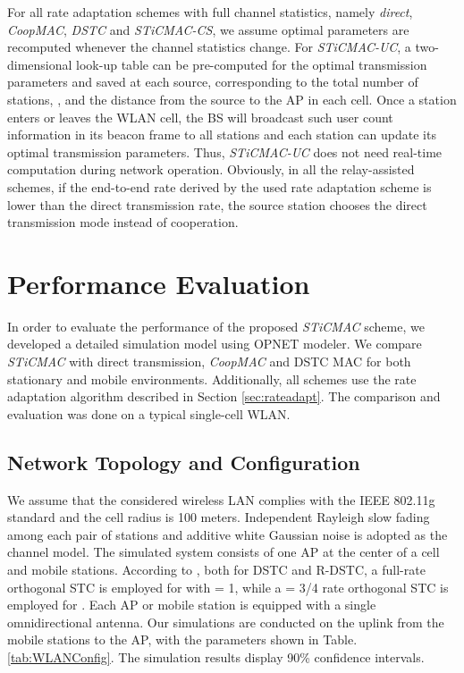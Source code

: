 \documentclass[peerreview,draftcls,onecolumn,12pt,a4paper]{IEEEtran}
\begin{document}
For all rate adaptation schemes with full channel statistics, namely \emph{direct}, \emph{CoopMAC}, \emph{DSTC} and \emph{STiCMAC-CS}, we assume optimal parameters are recomputed whenever the channel statistics change. For \emph{STiCMAC-UC}, a two-dimensional look-up table can be
pre-computed for the optimal transmission parameters and saved at
each source, corresponding to the total number of stations, ,
and the distance from the source to the AP in each cell. Once a
station enters or leaves the WLAN cell, the BS will broadcast such
user count information in its beacon frame to all stations and
each station can update its optimal transmission parameters. Thus,
\emph{STiCMAC-UC} does not need real-time computation during
network operation. Obviously, in all the relay-assisted schemes,
if the end-to-end rate derived by the used rate adaptation scheme
is lower than the direct transmission rate, the source station
chooses the direct transmission mode instead of cooperation.





\vspace{-0.2in}
\section{Performance Evaluation}
\label{PerformanceEvaluation} 

In order to evaluate the performance of the proposed {\em STiCMAC} scheme, we developed a detailed simulation model using OPNET modeler. We compare {\em STiCMAC} with direct transmission, {\em CoopMAC} and DSTC MAC for both stationary and mobile environments. Additionally, all schemes use the rate adaptation algorithm described in Section \ref{sec:rateadapt}. The comparison and evaluation was done on a typical single-cell WLAN.

\vspace{-0.15in}
\subsection{Network Topology and Configuration} \label{networktopology} 
\vspace{-0.05in}

We assume that the considered wireless LAN complies with the IEEE 802.11g
standard and the cell radius is 100 meters. Independent Rayleigh slow
fading among each pair of stations and additive white Gaussian noise is adopted as the channel
model. The simulated system consists of one AP at the center of a
cell and  mobile stations. According to
\cite{Jafarkhanistcbook}, both for DSTC and R-DSTC, a full-rate
orthogonal STC is employed for  with  = 1, while a 
= 3/4 rate orthogonal STC is employed for . Each AP or
mobile station is equipped with a single omnidirectional antenna.
Our simulations are conducted on the uplink from the mobile
stations to the AP, with the parameters shown in Table.
\ref{tab:WLANConfig}. The simulation results display 90\%
confidence intervals.
\end{document}

